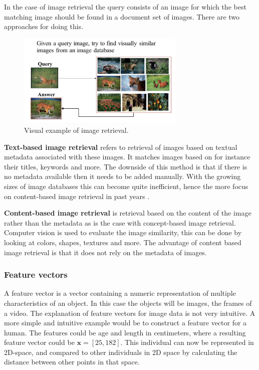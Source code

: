 \documentclass{article}
\begin{document}
In the case of image retrieval the query consists of an image for which the best matching image should be found in a document set of images. There are two approaches for doing this.

\begin{figure}[H]
	\includegraphics[width=8cm]{images/imageretrieval.png}
	\centering
	\caption{Visual example of image retrieval.}
	\label{fig:imageretrieval}
\end{figure}

\textbf{Text-based image retrieval} refers to retrieval of images based on textual metadata associated with these images. It matches images based on for instance their titles, keywords and more. The downside of this method is that if there is no metadata available then it needs to be added manually. With the growing sizes of image databases this can become quite inefficient, hence the more focus on content-based image retrieval in past years \cite{rajam2013survey}.

\textbf{Content-based image retrieval} is retrieval based on the content of the image rather than the metadata as is the case with concept-based image retrieval. Computer vision is used to evaluate the image similarity, this can be done by looking at colors, shapes, textures and more. The advantage of content based image retrieval is that it does not rely on the metadata of images.

\subsubsection{Feature vectors}
A feature vector is a vector containing a numeric representation of multiple characteristics of an object. In this case the objects will be images, the frames of a video. The explanation of feature vectors for image data is not very intuitive. A more simple and intuitive example would be to construct a feature vector for a human. The features could be age and length in centimeters, where a resulting feature vector could be $\textbf{x} = [25,182]$. This individual can now be represented in 2D-space, and compared to other individuals in 2D space by calculating the distance between other points in that space.
\end{document}
